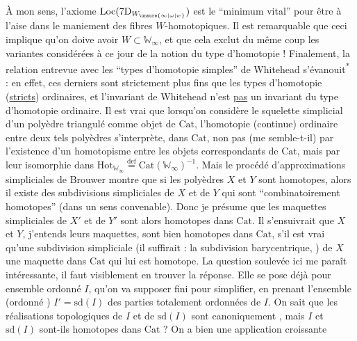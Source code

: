 À mon sens, l'axiome $\mathrm{Loc}(7\mathrm{D}_{W_{\unsure{\infty|\omega|w}}})$ est le  ``minimum vital'' pour  être à l'aise dans le maniement des fibres $W$-homotopiques. Il est remarquable que ceci implique qu'on doive avoir $W\subset\mathbb W_\infty$, et que cela exclut du même coup  les variantes considérées à ce jour de la notion du type d'homotopie !
 Finalement, la relation entrevue avec les ``types d'homotopie simples'' de Whitehead s'évanouit\textsuperscript{*} : en effet, ces derniers sont strictement
 plus fins que les types d'homotopie (\uline{stricts}) ordinaires, et l'invariant de Whitehead n'est \uline{pas} un invariant du type d'homotopie ordinaire. Il est vrai que lorsqu'on considère le squelette simplicial d'un polyèdre triangulé comme objet de $\mathrm{Cat}$, l'homotopie (continue) ordinaire entre deux tels polyèdres s'interprète, dans $\mathrm{Cat}$, non pas  (me semble-t-il) par l'existence d'un homotopisme\deleted{\unsure{,}} entre les objets correspondants de $\mathrm{Cat}$, mais par leur isomorphie dans $\mathrm{Hot}_{\mathbb W_\infty}\overset{\mathrm{def}}{=}\mathrm{Cat}(\mathbb W_\infty)^{-1}$. Mais le procédé d'approximations simpliciales de Brouwer montre que si les polyèdres $X$ et $Y$ sont homotopes, alors il existe des subdivisions simpliciales  de $X$ et de $Y$ qui sont ``combinatoirement homotopes'' (dans un sens convenable). Donc  je présume que les maquettes simpliciales de $X'$ et de $Y'$ sont alors homotopes dans $\mathrm{Cat}$. Il s'ensuivrait que
$X$ et $Y$, j'entends leurs maquettes, sont bien homotopes dans $\mathrm{Cat}$, s'il est vrai qu'une subdivision simpliciale (il suffirait : la subdivision barycentrique, )  de $X$  une maquette dans $\mathrm{Cat}$ qui lui est homotope. La question soulevée ici me paraît intéressante, il faut visiblement en trouver la réponse. Elle se pose déjà pour  ensemble ordonné $I$, qu'on va supposer fini pour simplifier, en prenant l'ensemble (ordonné ) $I'=\mathrm{sd}(I)$ des parties totalement ordonnées de $I$. On sait que les réalisations topologiques de $I$ et de $\mathrm{sd}(I)$ sont canoniquement , mais $I$ et $\mathrm{sd}(I)$ sont-ils homotopes dans $\mathrm{Cat}$ ? On a bien une application croissante


